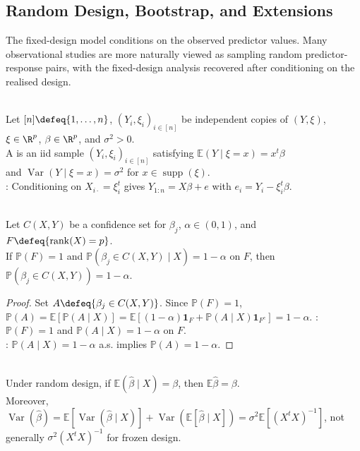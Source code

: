 \subsection{Random Design, Bootstrap, and Extensions}

The fixed-design model conditions on the observed predictor values.  Many observational studies are more naturally viewed as sampling random predictor-response pairs, with the fixed-design analysis recovered after conditioning on the realised design.

\begin{definition} \label{def:random-design-linear-regression-model} \\
Let $[n]\defeq\{1,\ldots,n\}$, $(Y_i,\xi_i)_{i\in[n]}$ be independent copies of $(Y,\xi)$, $\xi\in\R^p$, $\beta\in\R^p$, and $\sigma^2>0$.\\
A  is an iid sample $(Y_i,\xi_i)_{i\in[n]}$ satisfying $\mathbb{E}(Y\mid \xi=x)=x^t\beta$\\
and $\operatorname{Var}(Y\mid \xi=x)=\sigma^2$ for $x\in\operatorname{supp}(\xi)$.\\
: Conditioning on $X_{i\cdot}=\xi_i^t$ gives $Y_{1:n}=X\beta+e$ with $e_i=Y_i-\xi_i^t\beta$.
\end{definition}

\begin{proposition} \label{prop:fixed-design-intervals-unconditional-coverage} \\
Let $C(X,Y)$ be a confidence set for $\beta_j$, $\alpha\in(0,1)$, and $F\defeq\{\operatorname{rank}(X)=p\}$.\\
If $\mathbb{P}(F)=1$ and $\mathbb{P}(\beta_j\in C(X,Y)\mid X)=1-\alpha$ on $F$, then $\mathbb{P}(\beta_j\in C(X,Y))=1-\alpha$.
\begin{proof}
Set $A\defeq\{\beta_j\in C(X,Y)\}$. Since $\mathbb{P}(F)=1$, $\mathbb{P}(A)=\mathbb{E}[\mathbb{P}(A\mid X)]=\mathbb{E}[(1-\alpha)\mathbf{1}_F+\mathbb{P}(A\mid X)\mathbf{1}_{F^c}]=1-\alpha$.
: $\mathbb{P}(F)=1$ and $\mathbb{P}(A\mid X)=1-\alpha$ on $F$.\\
: $\mathbb{P}(A\mid X)=1-\alpha$ a.s. implies $\mathbb{P}(A)=1-\alpha$.
\end{proof}
\end{proposition}

\begin{remark} \label{rem:random-design-variance-differs} \\
Under random design, if $\mathbb{E}(\widehat{\beta}\mid X)=\beta$, then $\mathbb{E}\widehat{\beta}=\beta$.\\
Moreover, $\operatorname{Var}(\widehat{\beta})=\mathbb{E}[\operatorname{Var}(\widehat{\beta}\mid X)]+\operatorname{Var}(\mathbb{E}[\widehat{\beta}\mid X])=\sigma^2\mathbb{E}[(X^tX)^{-1}]$, not generally $\sigma^2(X^tX)^{-1}$ for frozen design.
\end{remark}

